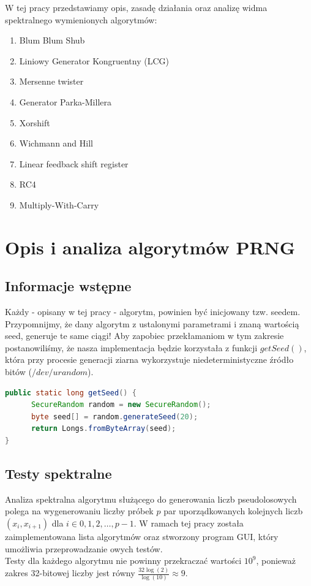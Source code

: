 \documentclass[a4paper, 11pt]{article} %
\begin{document}
W tej pracy przedstawiamy opis, zasadę działania oraz analizę widma spektralnego wymienionych algorytmów:
\begin{enumerate}
\item Blum Blum Shub
\item Liniowy Generator Kongruentny (LCG)
\item Mersenne twister
\item Generator Parka-Millera
\item Xorshift
\item Wichmann and Hill
\item Linear feedback shift register
\item RC4
\item Multiply-With-Carry
\end{enumerate}
\pagebreak
\section{Opis i analiza algorytmów PRNG}
\subsection*{Informacje wstępne}
Każdy - opisany w tej pracy - algorytm, powinien być inicjowany tzw. seedem. Przypomnijmy, że dany algorytm z ustalonymi parametrami i znaną wartością seed, generuje te same ciągi! Aby zapobiec przekłamaniom w tym zakresie postanowiliśmy, że nasza implementacja będzie korzystała z funkcji $getSeed()$, która przy procesie generacji ziarna wykorzystuje niedeterministyczne źródło bitów ($/dev/urandom$). \begin{lstlisting}[style=mystyle, language=java, frame=single, caption = Przykładowa funkcja generująca seed.]
public static long getSeed() {
      SecureRandom random = new SecureRandom();
      byte seed[] = random.generateSeed(20);
      return Longs.fromByteArray(seed);
}
\end{lstlisting}
\subsection*{Testy spektralne}
Analiza spektralna algorytmu służącego do generowania liczb pseudolosowych polega na wygenerowaniu liczby próbek $p$ par uporządkowanych kolejnych liczb $(x_{i}, x_{i+1})$ dla $i \in 0,1,2,\dots,p-1$. W ramach tej pracy została zaimplementowana lista algorytmów oraz stworzony program GUI, który umożliwia przeprowadzanie owych testów. \\
Testy dla każdego algorytmu nie powinny przekraczać wartości $10^{9}$, ponieważ zakres 32-bitowej liczby jest równy $\frac{32\log(2)}{\log(10)} \approx 9$.
\end{document}
